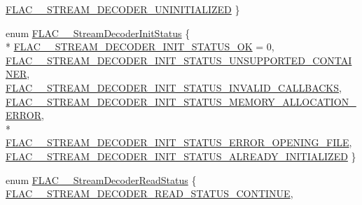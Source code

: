 \begin{DoxyCompactItemize}
\hyperlink{group__flac__stream__decoder_gga3adb6891c5871a87cd5bbae6c770ba2da565eaf4d5e68b440ecec771cb22d3427}{F\+L\+A\+C\+\_\+\+\_\+\+S\+T\+R\+E\+A\+M\+\_\+\+D\+E\+C\+O\+D\+E\+R\+\_\+\+U\+N\+I\+N\+I\+T\+I\+A\+L\+I\+Z\+ED}
 \}
\item 
enum \hyperlink{group__flac__stream__decoder_gaaed54a24ac6310d29c5cafba79759c44}{F\+L\+A\+C\+\_\+\+\_\+\+Stream\+Decoder\+Init\+Status} \{ \\*
\hyperlink{group__flac__stream__decoder_ggaaed54a24ac6310d29c5cafba79759c44ac94c7e9396f30642f34805e5d626e011}{F\+L\+A\+C\+\_\+\+\_\+\+S\+T\+R\+E\+A\+M\+\_\+\+D\+E\+C\+O\+D\+E\+R\+\_\+\+I\+N\+I\+T\+\_\+\+S\+T\+A\+T\+U\+S\+\_\+\+OK} = 0, 
\hyperlink{group__flac__stream__decoder_ggaaed54a24ac6310d29c5cafba79759c44a8f2188c616c9bc09638eece3ae55f152}{F\+L\+A\+C\+\_\+\+\_\+\+S\+T\+R\+E\+A\+M\+\_\+\+D\+E\+C\+O\+D\+E\+R\+\_\+\+I\+N\+I\+T\+\_\+\+S\+T\+A\+T\+U\+S\+\_\+\+U\+N\+S\+U\+P\+P\+O\+R\+T\+E\+D\+\_\+\+C\+O\+N\+T\+A\+I\+N\+ER}, 
\hyperlink{group__flac__stream__decoder_ggaaed54a24ac6310d29c5cafba79759c44a798ad4b6c4e556fd4cb1afbc29562eca}{F\+L\+A\+C\+\_\+\+\_\+\+S\+T\+R\+E\+A\+M\+\_\+\+D\+E\+C\+O\+D\+E\+R\+\_\+\+I\+N\+I\+T\+\_\+\+S\+T\+A\+T\+U\+S\+\_\+\+I\+N\+V\+A\+L\+I\+D\+\_\+\+C\+A\+L\+L\+B\+A\+C\+KS}, 
\hyperlink{group__flac__stream__decoder_ggaaed54a24ac6310d29c5cafba79759c44a0110567f0715c6f87357388bc7fa98f9}{F\+L\+A\+C\+\_\+\+\_\+\+S\+T\+R\+E\+A\+M\+\_\+\+D\+E\+C\+O\+D\+E\+R\+\_\+\+I\+N\+I\+T\+\_\+\+S\+T\+A\+T\+U\+S\+\_\+\+M\+E\+M\+O\+R\+Y\+\_\+\+A\+L\+L\+O\+C\+A\+T\+I\+O\+N\+\_\+\+E\+R\+R\+OR}, 
\\*
\hyperlink{group__flac__stream__decoder_ggaaed54a24ac6310d29c5cafba79759c44a8184c306e0cd2565a8c5adc1381cb469}{F\+L\+A\+C\+\_\+\+\_\+\+S\+T\+R\+E\+A\+M\+\_\+\+D\+E\+C\+O\+D\+E\+R\+\_\+\+I\+N\+I\+T\+\_\+\+S\+T\+A\+T\+U\+S\+\_\+\+E\+R\+R\+O\+R\+\_\+\+O\+P\+E\+N\+I\+N\+G\+\_\+\+F\+I\+LE}, 
\hyperlink{group__flac__stream__decoder_ggaaed54a24ac6310d29c5cafba79759c44a98bc501c9b2fb5d92d8bb0b3321d504f}{F\+L\+A\+C\+\_\+\+\_\+\+S\+T\+R\+E\+A\+M\+\_\+\+D\+E\+C\+O\+D\+E\+R\+\_\+\+I\+N\+I\+T\+\_\+\+S\+T\+A\+T\+U\+S\+\_\+\+A\+L\+R\+E\+A\+D\+Y\+\_\+\+I\+N\+I\+T\+I\+A\+L\+I\+Z\+ED}
 \}
\item 
enum \hyperlink{group__flac__stream__decoder_gad793ead451206c64a91dc0b851027b93}{F\+L\+A\+C\+\_\+\+\_\+\+Stream\+Decoder\+Read\+Status} \{ \hyperlink{group__flac__stream__decoder_ggad793ead451206c64a91dc0b851027b93a9a5be0fcf0279b98b2fd462bc4871d06}{F\+L\+A\+C\+\_\+\+\_\+\+S\+T\+R\+E\+A\+M\+\_\+\+D\+E\+C\+O\+D\+E\+R\+\_\+\+R\+E\+A\+D\+\_\+\+S\+T\+A\+T\+U\+S\+\_\+\+C\+O\+N\+T\+I\+N\+UE}, 

\end{DoxyCompactItemize}
